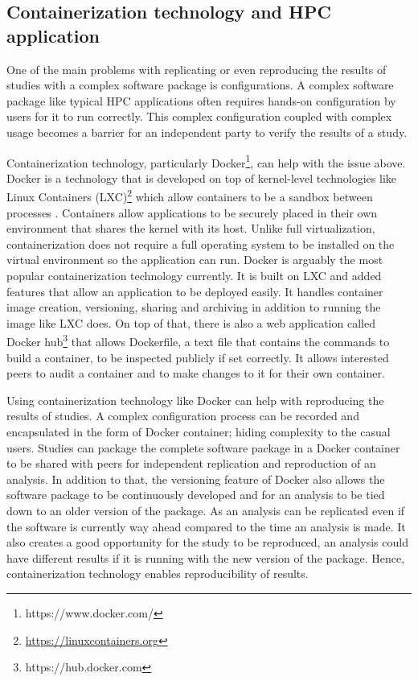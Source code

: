 \subsection{Containerization technology and HPC application}




One of the main problems with replicating or even reproducing the results of studies with a complex software package is configurations. A complex software package like typical HPC applications often requires hands-on configuration by users for it to run correctly. This complex configuration coupled with complex usage becomes a barrier for an independent party to verify the results of a study.

Containerization technology, particularly Docker\footnote{https://www.docker.com/}, can help with the issue above. Docker is a technology that is developed on top of kernel-level technologies like Linux Containers (LXC)\footnote{\url{https://linuxcontainers.org}} which allow containers to be a sandbox between processes \citep{merkel2014docker}. Containers allow applications to be securely placed in their own environment that shares the kernel with its host. Unlike full virtualization, containerization does not require a full operating system to be installed on the virtual environment so the application can run. Docker is arguably the most popular containerization technology currently. It is built on LXC and added features that allow an application to be deployed easily. It handles container image creation, versioning, sharing and archiving in addition to running the image like LXC does. On top of that, there is also a web application called Docker hub\footnote{https://hub.docker.com} that allows Dockerfile, a text file that contains the commands to build a container, to be inspected publicly if set correctly. It allows interested peers to audit a container and to make changes to it for their own container.

Using containerization technology like Docker can help with reproducing the results of studies. A complex configuration process can be recorded and encapsulated in the form of Docker container;  hiding complexity to the casual users. Studies can package the complete software package in a Docker container to be shared with peers for independent replication and reproduction of an analysis. In addition to that, the versioning feature of Docker also allows the software package to be continuously developed and for an analysis to be tied down to an older version of the package. As an analysis can be replicated even if the software is currently way ahead compared to the time an analysis is made. It  also creates a good opportunity for the study to be reproduced, an analysis could have different results if it is running with the new version of the package. Hence, containerization technology enables reproducibility of results.

